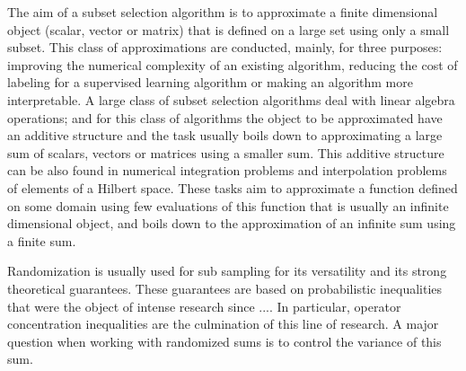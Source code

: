 \documentclass[twoside,11pt]{book}
\numberwithin{theorem}{chapter}
\numberwithin{definition}{chapter}
\numberwithin{proposition}{chapter}
\numberwithin{corollary}{chapter}
\numberwithin{example}{chapter}
\numberwithin{lemma}{chapter}
\numberwithin{assumption}{chapter}
\begin{document}
The aim of a subset selection algorithm is to approximate a finite dimensional object (scalar, vector or matrix) that is defined on a large set using only a small subset. This class of approximations are conducted, mainly, for three purposes: improving the numerical complexity of an existing algorithm, reducing the cost of labeling for a supervised learning algorithm or making an algorithm more interpretable.
A large class of subset selection algorithms deal with linear algebra operations; and for this class of algorithms the object to be approximated have an additive structure and the task usually boils down to approximating a large sum of scalars, vectors or matrices using a smaller sum. This additive structure can be also found in numerical integration problems and interpolation problems of elements of a Hilbert space. These tasks aim to approximate a function defined on some domain using few evaluations of this function that is usually an infinite dimensional object, and boils down to the approximation of an infinite sum using a finite sum.



Randomization is usually used for sub sampling for its versatility and its strong theoretical guarantees. These guarantees are based on probabilistic inequalities that were the object of intense research since .... In particular, operator concentration inequalities are the culmination of this line of research.
A major question when working with randomized sums is to control the variance of this sum.




\end{document}

